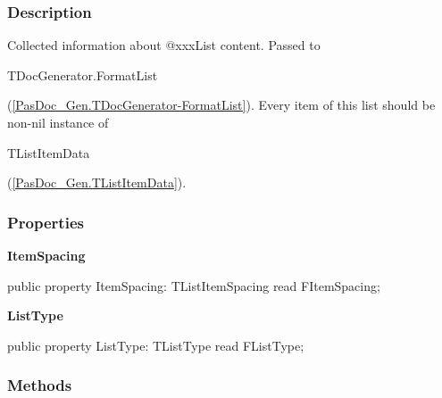 \documentclass{report}
\newif\ifpdf
\begin{document}
\subsubsection*{\large{\textbf{Description}}\normalsize\hspace{1ex}\hfill}
Collected information about @xxxList content. Passed to \begin{ttfamily}TDocGenerator.FormatList\end{ttfamily}(\ref{PasDoc_Gen.TDocGenerator-FormatList}). Every item of this list should be non{-}nil instance of \begin{ttfamily}TListItemData\end{ttfamily}(\ref{PasDoc_Gen.TListItemData}).\subsubsection*{\large{\textbf{Properties}}\normalsize\hspace{1ex}\hfill}
\begin{list}{}{
\setlength{\itemindent}{0cm}
\setlength{\listparindent}{0cm}
\setlength{\leftmargin}{\evensidemargin}
\addtolength{\leftmargin}{\tmplength}
\settowidth{\labelsep}{X}
\addtolength{\leftmargin}{\labelsep}
\setlength{\labelwidth}{\tmplength}
}
\label{PasDoc_Gen.TListData-ItemSpacing}
\item[\textbf{ItemSpacing}\hfill]
\ifpdf
\begin{flushleft}
\fi
\begin{ttfamily}
public property ItemSpacing: TListItemSpacing read FItemSpacing;\end{ttfamily}

\ifpdf
\end{flushleft}
\fi


\par  \label{PasDoc_Gen.TListData-ListType}
\item[\textbf{ListType}\hfill]
\ifpdf
\begin{flushleft}
\fi
\begin{ttfamily}
public property ListType: TListType read FListType;\end{ttfamily}

\ifpdf
\end{flushleft}
\fi


\par  \end{list}
\subsubsection*{\large{\textbf{Methods}}\normalsize\hspace{1ex}\hfill}
\end{document}
